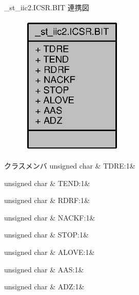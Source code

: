 \+\_\+st\+\_\+iic2.\+I\+C\+S\+R.\+B\+I\+T 連携図
\nopagebreak
\begin{figure}[H]
\begin{center}
\leavevmode
\includegraphics[width=139pt]{df/d97/struct__st__iic2_8ICSR_8BIT__coll__graph}
\end{center}
\end{figure}
\begin{DoxyFields}{クラスメンバ}
unsigned char\label{3694s_8h_a1eac1fe6afb8bd4be047e55fbdc3d0ec}
&
T\+D\+R\+E\+:1&
\\
\hline

unsigned char\label{3694s_8h_a21c0d9578949b414fbab707ce221eb75}
&
T\+E\+N\+D\+:1&
\\
\hline

unsigned char\label{3694s_8h_a42d1e8ea37c83c47da6dcbedfb3b8571}
&
R\+D\+R\+F\+:1&
\\
\hline

unsigned char\label{3694s_8h_a74277ac59d65ea594c8945e495ade806}
&
N\+A\+C\+K\+F\+:1&
\\
\hline

unsigned char\label{3694s_8h_a615a46af313786fc4e349f34118be111}
&
S\+T\+O\+P\+:1&
\\
\hline

unsigned char\label{3694s_8h_aae3eeaa3058662feaf0b6368715225f3}
&
A\+L\+O\+V\+E\+:1&
\\
\hline

unsigned char\label{3694s_8h_a223e4b9f814ff8448c99d8b8cb524556}
&
A\+A\+S\+:1&
\\
\hline

unsigned char\label{3694s_8h_a8818a90e3c873a72acac86c0c576d5ce}
&
A\+D\+Z\+:1&
\\
\hline

\end{DoxyFields}
\label{union__st__iic2_8SAR}
